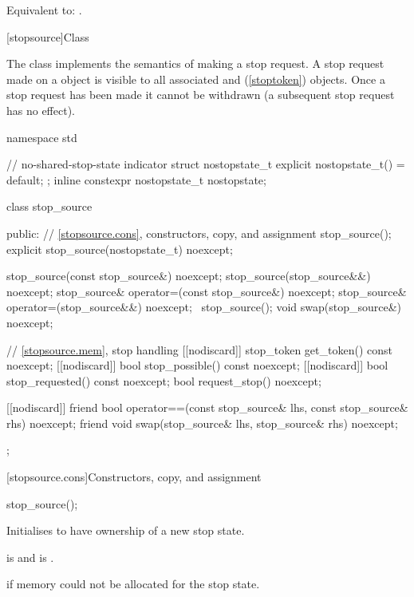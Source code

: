 \begin{itemdescr}
\pnum
\effects
Equivalent to: .
\end{itemdescr}

%
[stopsource]{Class }

\pnum
{}%
The class  implements the semantics of making a stop request.
A stop request made on a  object is visible to all
associated  and  (\ref{stoptoken}) objects.
Once a stop request has been made it cannot be withdrawn
(a subsequent stop request has no effect).

%
%

\begin{codeblock}
namespace std {
  // no-shared-stop-state indicator
  struct nostopstate_t {
    explicit nostopstate_t() = default;
  };
  inline constexpr nostopstate_t nostopstate{};

  class stop_source {
  public:
    // \ref{stopsource.cons}, constructors, copy, and assignment
    stop_source();
    explicit stop_source(nostopstate_t) noexcept;

    stop_source(const stop_source&) noexcept;
    stop_source(stop_source&&) noexcept;
    stop_source& operator=(const stop_source&) noexcept;
    stop_source& operator=(stop_source&&) noexcept;
    ~stop_source();
    void swap(stop_source&) noexcept;

    // \ref{stopsource.mem}, stop handling
    [[nodiscard]] stop_token get_token() const noexcept;
    [[nodiscard]] bool stop_possible() const noexcept;
    [[nodiscard]] bool stop_requested() const noexcept;
    bool request_stop() noexcept;

    [[nodiscard]] friend bool
      operator==(const stop_source& lhs, const stop_source& rhs) noexcept;
    friend void swap(stop_source& lhs, stop_source& rhs) noexcept;
  };
}
\end{codeblock}

[stopsource.cons]{Constructors, copy, and assignment}

%
\begin{itemdecl}
stop_source();
\end{itemdecl}

\begin{itemdescr}
\pnum
\effects
Initialises  to have ownership of a new stop state.

\pnum
\ensures
{} is 
and  is .

\pnum
\throws
{} if memory could not be allocated for the stop state.
\end{itemdescr}


